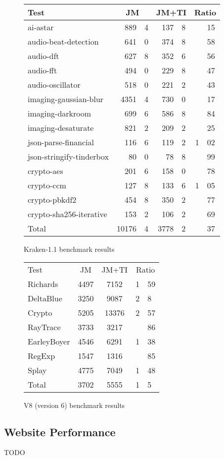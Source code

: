 \begin{figure}
\begin{center}
\begin{tabular}{|l|r@{.}lr@{.}l|r@{.}l|}
\hline
Test & \multicolumn{2}{|c|}{JM}
     & \multicolumn{2}{|c|}{JM+TI}
     & \multicolumn{2}{|c|}{Ratio} \\
\hline
ai-astar & 889&4 & 137&8 & &15 \\
audio-beat-detection & 641&0 & 374&8 & &58 \\
audio-dft & 627&8 & 352&6 & &56 \\
audio-fft & 494&0 & 229&8 & &47 \\
audio-oscillator & 518&0 & 221&2 & &43 \\
imaging-gaussian-blur & 4351&4 & 730&0 & &17 \\
imaging-darkroom & 699&6 & 586&8 & &84 \\
imaging-desaturate & 821&2 & 209&2 & &25 \\
json-parse-financial & 116&6 & 119&2 & 1&02 \\
json-stringify-tinderbox & 80&0 & 78&8 & &99 \\
crypto-aes & 201&6 & 158&0 & &78 \\
crypto-ccm & 127&8 & 133&6 & 1&05 \\
crypto-pbkdf2 & 454&8 & 350&2 & &77 \\
crypto-sha256-iterative & 153&2 & 106&2 & &69 \\
\hline
Total & 10176&4 & 3778&2 & &37 \\
\hline
\end{tabular}
\end{center}
\caption{Kraken-1.1 benchmark results}
\end{figure}

\begin{figure}
\begin{center}
\begin{tabular}{|l|cc|r@{.}l|}
\hline
Test & JM & JM+TI & \multicolumn{2}{|c|}{Ratio} \\
Richards & 4497 & 7152 & 1&59 \\
DeltaBlue & 3250 & 9087 & 2&8 \\
Crypto & 5205 & 13376 & 2&57 \\
RayTrace & 3733 & 3217 & &86 \\
EarleyBoyer & 4546 & 6291 & 1&38 \\
RegExp & 1547 & 1316 & &85 \\
Splay & 4775 & 7049 & 1&48 \\
\hline
Total & 3702 & 5555 & 1&5 \\
\hline
\end{tabular}
\end{center}
\caption{V8 (version 6) benchmark results}
\end{figure}

\subsection{Website Performance}

TODO
